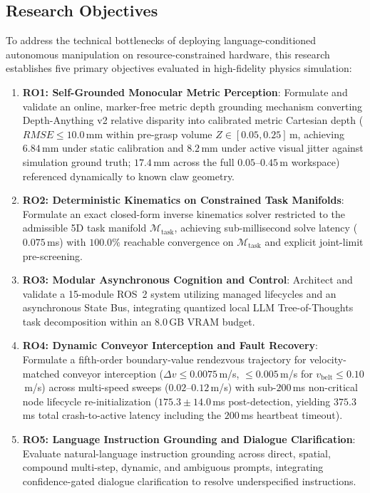 \documentclass[journal]{IEEEtran}
\begin{document}
\subsection{Research Objectives}
\label{sec_objectives}
To address the technical bottlenecks of deploying language-conditioned autonomous manipulation on resource-constrained hardware, this research establishes five primary objectives evaluated in high-fidelity physics simulation:
\begin{enumerate}
    \item \textbf{RO1: Self-Grounded Monocular Metric Perception}: Formulate and validate an online, marker-free metric depth grounding mechanism converting Depth-Anything v2 relative disparity into calibrated metric Cartesian depth ($RMSE \le 10.0$\,mm within pre-grasp volume $Z \in [0.05, 0.25]$\,m, achieving $6.84$\,mm under static calibration and $8.2$\,mm under active visual jitter against simulation ground truth; $17.4$\,mm across the full $0.05\text{--}0.45$\,m workspace) referenced dynamically to known claw geometry.
    \item \textbf{RO2: Deterministic Kinematics on Constrained Task Manifolds}: Formulate an exact closed-form inverse kinematics solver restricted to the admissible 5D task manifold $\mathcal{M}_{\text{task}}$, achieving sub-millisecond solve latency ($0.075$\,ms) with $100.0\%$ reachable convergence on $\mathcal{M}_{\text{task}}$ and explicit joint-limit pre-screening.
    \item \textbf{RO3: Modular Asynchronous Cognition and Control}: Architect and validate a 15-module ROS~2 system utilizing managed lifecycles and an asynchronous State Bus, integrating quantized local LLM Tree-of-Thoughts task decomposition within an 8.0\,GB VRAM budget.
    \item \textbf{RO4: Dynamic Conveyor Interception and Fault Recovery}: Formulate a fifth-order boundary-value rendezvous trajectory for velocity-matched conveyor interception ($\Delta v \le 0.0075$\,m/s, $\le 0.005$\,m/s for $v_{\text{belt}} \le 0.10$\,m/s) across multi-speed sweeps ($0.02\text{--}0.12$\,m/s) with sub-$200$\,ms non-critical node lifecycle re-initialization ($175.3 \pm 14.0$\,ms post-detection, yielding $375.3$\,ms total crash-to-active latency including the $200$\,ms heartbeat timeout).
    \item \textbf{RO5: Language Instruction Grounding and Dialogue Clarification}: Evaluate natural-language instruction grounding across direct, spatial, compound multi-step, dynamic, and ambiguous prompts, integrating confidence-gated dialogue clarification to resolve underspecified instructions.
\end{enumerate}
\end{document}
